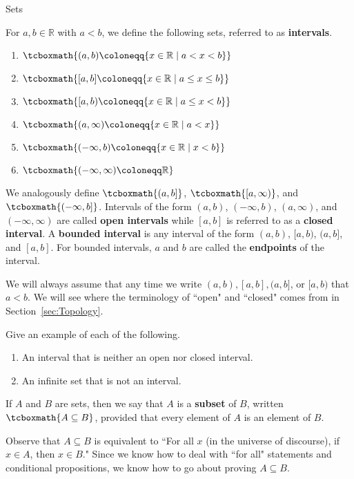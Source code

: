 \begin{section}{Sets}
\begin{definition}
For $a,b\in\mathbb{R}$ with $a<b$, we define the following sets, referred to as \textbf{intervals}.
\begin{enumerate}[label=\textrm{(\alph*)}]
\item $\tcboxmath{(a,b)\coloneqq \{x\in\mathbb{R}\mid a<x<b\}}$
\item $\tcboxmath{[a,b]\coloneqq \{x\in\mathbb{R}\mid a\leq x\leq b\}}$
\item $\tcboxmath{[a,b)\coloneqq \{x\in\mathbb{R}\mid a\leq x< b\}}$
\item $\tcboxmath{(a,\infty)\coloneqq \{x\in\mathbb{R}\mid a<x\}}$
\item $\tcboxmath{(-\infty,b)\coloneqq \{x\in\mathbb{R}\mid x<b\}}$
\item $\tcboxmath{(-\infty,\infty)\coloneqq \mathbb{R}}$
\end{enumerate}
We analogously define $\tcboxmath{(a,b]}$, $\tcboxmath{[a,\infty)}$, and $\tcboxmath{(-\infty,b]}$. Intervals of the form $(a,b)$, $(-\infty,b)$, $(a,\infty)$, and $(-\infty,\infty)$ are called \textbf{open intervals} while $[a,b]$ is referred to as a \textbf{closed interval}. A \textbf{bounded interval} is any interval of the form $(a,b)$, $[a,b)$, $(a,b]$, and $[a,b]$. For bounded intervals, $a$ and $b$ are called the \textbf{endpoints} of the interval.
\end{definition}

We will always assume that any time we write $(a,b), [a,b], (a,b]$, or $[a,b)$ that $a<b$. We will see where the terminology of ``open" and ``closed" comes from in Section~\ref{sec:Topology}. 

\begin{problem}
Give an example of each of the following.
\begin{enumerate}[label=\textrm{(\alph*)}]
\item An interval that is neither an open nor closed interval.
\item An infinite set that is not an interval.
\end{enumerate}
\end{problem}

\begin{definition}
If $A$ and $B$ are sets, then we say that $A$ is a \textbf{subset} of $B$, written $\tcboxmath{A\subseteq B}$, provided that every element of $A$ is an element of $B$.
\end{definition}

Observe that $A\subseteq B$ is equivalent to ``For all $x$ (in the universe of discourse), if $x\in A$, then $x\in B$."  Since we know how to deal with ``for all" statements and conditional propositions, we know how to go about proving $A\subseteq B$.


\end{section}
